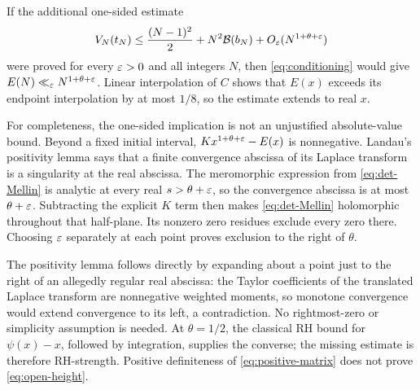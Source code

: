 If the additional one-sided estimate
\begin{equation}\label{eq:open-height}
 V_N(t_N)\le\frac{(N-1)^2}{2}+N^2\mathcal B(b_N)
                          +O_\varepsilon(N^{1+\theta+\varepsilon})
\end{equation}
were proved for every $\varepsilon>0$ and all integers $N$, then \eqref{eq:conditioning} would give $E(N)\ll_\varepsilon N^{1+\theta+\varepsilon}$. Linear interpolation of $C$ shows that $E(x)$ exceeds its endpoint interpolation by at most $1/8$, so the estimate extends to real $x$.

For completeness, the one-sided implication is not an unjustified absolute-value bound. Beyond a fixed initial interval, $Kx^{1+\theta+\varepsilon}-E(x)$ is nonnegative. Landau's positivity lemma says that a finite convergence abscissa of its Laplace transform is a singularity at the real abscissa. The meromorphic expression from \eqref{eq:det-Mellin} is analytic at every real $s>\theta+\varepsilon$, so the convergence abscissa is at most $\theta+\varepsilon$. Subtracting the explicit $K$ term then makes \eqref{eq:det-Mellin} holomorphic throughout that half-plane. Its nonzero zero residues exclude every zero there. Choosing $\varepsilon$ separately at each point proves exclusion to the right of $\theta$.

The positivity lemma follows directly by expanding about a point just to the right of an allegedly regular real abscissa: the Taylor coefficients of the translated Laplace transform are nonnegative weighted moments, so monotone convergence would extend convergence to its left, a contradiction. No rightmost-zero or simplicity assumption is needed. At $\theta=1/2$, the classical RH bound for $\psi(x)-x$, followed by integration, supplies the converse; the missing estimate is therefore RH-strength. Positive definiteness of \eqref{eq:positive-matrix} does not prove \eqref{eq:open-height}.
